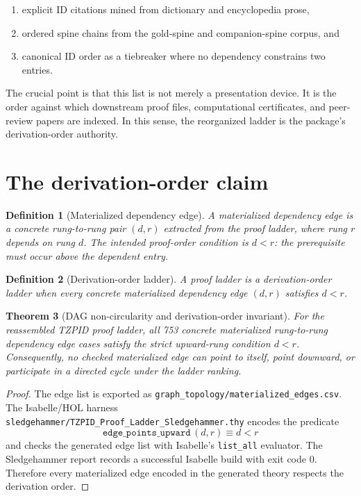 \documentclass[11pt]{article}
\newtheorem{theorem}{Theorem}[section]
\newtheorem{definition}[theorem]{Definition}
\theoremstyle{remark}
\begin{document}
\begin{enumerate}
  \item explicit ID citations mined from dictionary and encyclopedia prose,
  \item ordered spine chains from the gold-spine and companion-spine corpus, and
  \item canonical ID order as a tiebreaker where no dependency constrains two entries.
\end{enumerate}

The crucial point is that this list is not merely a presentation device. It is the order against which downstream proof files, computational certificates, and peer-review papers are indexed. In this sense, the reorganized ladder is the package's derivation-order authority.

\section{The derivation-order claim}
\label{sec:claim}

\begin{definition}[Materialized dependency edge]
A materialized dependency edge is a concrete rung-to-rung pair $(d,r)$ extracted from the proof ladder, where rung $r$ depends on rung $d$. The intended proof-order condition is $d < r$: the prerequisite must occur above the dependent entry.
\end{definition}

\begin{definition}[Derivation-order ladder]
A proof ladder is a derivation-order ladder when every concrete materialized dependency edge $(d,r)$ satisfies $d < r$.
\end{definition}

\begin{theorem}[DAG non-circularity and derivation-order invariant]
For the reassembled TZPID proof ladder, all 753 concrete materialized rung-to-rung dependency edge cases satisfy the strict upward-rung condition $d < r$. Consequently, no checked materialized edge can point to itself, point downward, or participate in a directed cycle under the ladder ranking.
\end{theorem}

\begin{proof}
The edge list is exported as \texttt{graph\_topology/materialized\_edges.csv}. The Isabelle/HOL harness \texttt{sledgehammer/TZPID\_Proof\_Ladder\_Sledgehammer.thy} encodes the predicate
\[
\texttt{edge\_points\_upward}\,(d,r) \equiv d < r
\]
and checks the generated edge list with Isabelle's \texttt{list\_all} evaluator. The Sledgehammer report records a successful Isabelle build with exit code 0. Therefore every materialized edge encoded in the generated theory respects the derivation order.
\end{proof}
\end{document}
